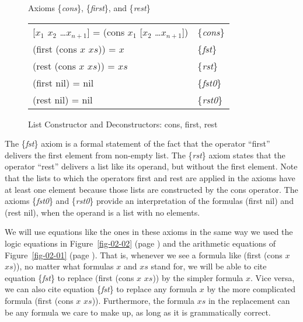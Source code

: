 \begin{figure}
\begin{center}
 Axioms \{\emph{cons}\}, \{\emph{first}\}, and \{\emph{rest}\} \\
\begin{tabular}{ll}
 [$x_1$ $x_2$ \dots $x_{n+1}$] = (cons $x_1$ [$x_2$ \dots $x_{n+1}$]) & \{\emph{cons}\} \\
 (first (cons $x$ $xs$)) = $x$                                        & \{\emph{fst}\}\\
 (rest (cons $x$ $xs$))  = $xs$                                       & \{\emph{rst}\} \\
 (first nil) = nil                                                    & \{\emph{fst0}\}\\
 (rest nil) = nil                                                     & \{\emph{rst0}\}
\end{tabular}
\end{center}
\caption{List Constructor and Deconstructors: cons, first, rest}
\label{first-rest-cons}
\end{figure}

The \{\emph{fst}\} axiom is a formal statement of the fact that
the operator ``first'' delivers the first element from non-empty list.
The \{\emph{rst}\} axiom states that the operator ``rest'' delivers
a list like its operand, but without the first element.
Note that the lists to which the operators first and rest
are applied in the axioms have at least one element
because those lists are constructed by the cons operator.
The axioms
\{\emph{fst0}\} and \{\emph{rst0}\}
provide an interpretation of the formulas (first nil) and (rest nil),
when the operand is a list with no elements.

We will use equations like the ones in these axioms in the
same way we used the logic equations in Figure~\ref{fig-02-02}
(page \pageref{fig-02-02}) and the arithmetic equations of
Figure~\ref{fig-02-01} (page \pageref{fig-02-01}).
That is, whenever we see a formula like (first (cons $x$ $xs$)),
no matter what formulas $x$ and $xs$ stand for,
we will be able to cite equation \{\emph{fst}\} to replace
(first (cons $x$ $xs$)) by the simpler formula $x$.
Vice versa, we can also cite equation \{\emph{fst}\}
to replace any formula $x$ by the more complicated formula
(first (cons $x$ $xs$)).
Furthermore, the formula $xs$ in the replacement can be
any formula we care to make up, as long as it is grammatically correct.

